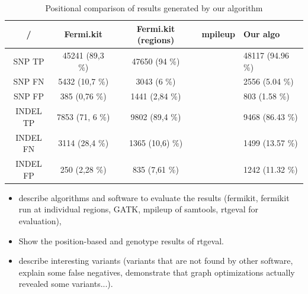 \begin{table}[h]
\begin{center}
\caption{Positional comparison of results generated by our algorithm}
\label{tab:positional-results}
\begin{tabular}{| c | c | c | c | p{3cm} |}
\hline
/ & Fermi.kit & Fermi.kit (regions) & mpileup & Our algo \\
\hline
SNP TP & 45241 (89,3 \%) & 47650 (94 \%) & & 48117 (94.96 \%) \\
\hline
SNP FN & 5432 (10,7 \%) & 3043 (6 \%) & & 2556 (5.04 \%) \\
\hline
SNP FP & 385 (0,76 \%) & 1441 (2,84 \%) & & 803 (1.58 \%) \\
\hline
INDEL TP & 7853 (71, 6 \%) & 9802 (89,4 \%) & & 9468 (86.43 \%) \\
\hline
INDEL FN & 3114 (28,4 \%) & 1365 (10,6) \%) & & 1499 (13.57 \%) \\
\hline
INDEL FP & 250 (2,28 \%) & 835 (7,61 \%) & & 1242 (11.32 \%) \\
\hline
\end{tabular}
\end{center}
\end{table}

\begin{itemize}
\item describe algorithms and software to evaluate the results (fermikit, fermikit run at individual regions, GATK, mpileup of samtools, rtgeval for evaluation),
\item Show the position-based and genotype results of rtgeval.
\item describe interesting variants (variants that are not found by other software, explain some false negatives, demonstrate that graph optimizations actually revealed some variants...).
\end{itemize}
